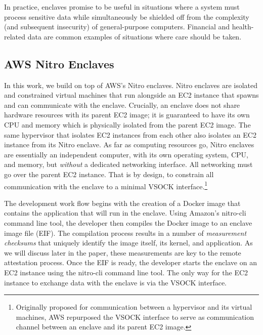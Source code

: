 In practice, enclaves promise to be useful in situations where a system must
process sensitive data while simultaneously be shielded off from the complexity
(and subsequent insecurity) of general-purpose computers. Financial and
health-related data are common examples of situations where care should be
taken.

\subsection{AWS Nitro Enclaves}
\label{sec:nitro}

In this work, we build on top of AWS's Nitro enclaves.  Nitro enclaves are
isolated and constrained virtual machines that run alongside an EC2 instance
that spawns and can communicate with the enclave.  Crucially, an enclave does
not share hardware resources with its parent EC2 image; it is guaranteed to
have its own CPU and memory which is physically isolated from the parent EC2
image.  The same hypervisor that isolates EC2 instances from each other also
isolates an EC2 instance from its Nitro enclave.  As far as computing resources
go, Nitro enclaves are essentially an independent computer, with its own
operating system, CPU, and memory, but \emph{without} a dedicated networking
interface.  All networking must go over the parent EC2 instance.  That is by
design, to constrain all communication with the enclave to a minimal VSOCK
interface.\footnote{Originally proposed for communication between a hypervisor
and its virtual machines, AWS repurposed the VSOCK interface to serve as
communication channel between an enclave and its parent EC2 image.}

The development work flow begins with the creation of a Docker image that
contains the application that will run in the enclave.  Using Amazon's
nitro-cli command line tool, the developer then compiles the Docker image to an
enclave image file (EIF).  The compilation process results in a number of
\emph{measurement checksums} that uniquely identify the image itself, its
kernel, and application.  As we will discuss later in the paper, these
measurements are key to the remote attestation process.
%
Once the EIF is ready, the developer starts the enclave on an EC2 instance
using the nitro-cli command line tool.  The only way for the EC2 instance to
exchange data with the enclave is via the VSOCK interface.

